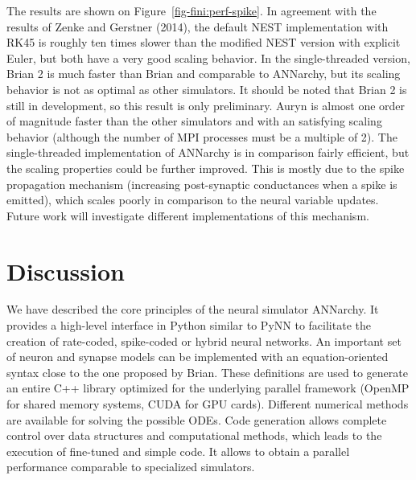 \documentclass[
  11pt,
  a4paper,
]{scrbook}
\begin{document}
The results are shown on Figure~\ref{fig-fini:perf-spike}. In agreement
with the results of Zenke and Gerstner (2014), the default NEST
implementation with RK45 is roughly ten times slower than the modified
NEST version with explicit Euler, but both have a very good scaling
behavior. In the single-threaded version, Brian 2 is much faster than
Brian and comparable to ANNarchy, but its scaling behavior is not as
optimal as other simulators. It should be noted that Brian 2 is still in
development, so this result is only preliminary. Auryn is almost one
order of magnitude faster than the other simulators and with an
satisfying scaling behavior (although the number of MPI processes must
be a multiple of 2). The single-threaded implementation of ANNarchy is
in comparison fairly efficient, but the scaling properties could be
further improved. This is mostly due to the spike propagation mechanism
(increasing post-synaptic conductances when a spike is emitted), which
scales poorly in comparison to the neural variable updates. Future work
will investigate different implementations of this mechanism.

\section{Discussion}\label{discussion-3}

We have described the core principles of the neural simulator ANNarchy.
It provides a high-level interface in Python similar to PyNN to
facilitate the creation of rate-coded, spike-coded or hybrid neural
networks. An important set of neuron and synapse models can be
implemented with an equation-oriented syntax close to the one proposed
by Brian. These definitions are used to generate an entire C++ library
optimized for the underlying parallel framework (OpenMP for shared
memory systems, CUDA for GPU cards). Different numerical methods are
available for solving the possible ODEs. Code generation allows complete
control over data structures and computational methods, which leads to
the execution of fine-tuned and simple code. It allows to obtain a
parallel performance comparable to specialized simulators.
\end{document}
